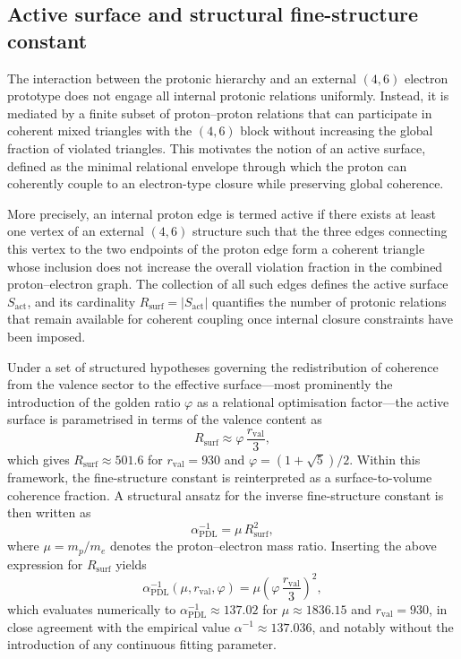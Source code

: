 \documentclass[11pt,a4paper]{article}
\begin{document}
\subsection{Active surface and structural fine-structure constant}
The interaction between the protonic hierarchy and an external $(4,6)$ electron prototype does not engage all internal protonic relations uniformly. Instead, it is mediated by a finite subset of proton–proton relations that can participate in coherent mixed triangles with the $(4,6)$ block without increasing the global fraction of violated triangles.\cite{LaubscherDerivationAlpha2026,LaubscherGoldenRatioPDL2026} This motivates the notion of an active surface, defined as the minimal relational envelope through which the proton can coherently couple to an electron-type closure while preserving global coherence.

More precisely, an internal proton edge is termed active if there exists at least one vertex of an external $(4,6)$ structure such that the three edges connecting this vertex to the two endpoints of the proton edge form a coherent triangle whose inclusion does not increase the overall violation fraction in the combined proton–electron graph.\cite{LaubscherDerivationAlpha2026} The collection of all such edges defines the active surface $S_{\mathrm{act}}$, and its cardinality $R_{\mathrm{surf}}=|S_{\mathrm{act}}|$ quantifies the number of protonic relations that remain available for coherent coupling once internal closure constraints have been imposed.

Under a set of structured hypotheses governing the redistribution of coherence from the valence sector to the effective surface—most prominently the introduction of the golden ratio $\varphi$ as a relational optimisation factor—the active surface is parametrised in terms of the valence content as
\begin{equation}
R_{\mathrm{surf}} \approx \varphi\,\frac{r_{\mathrm{val}}}{3},
\end{equation}
which gives $R_{\mathrm{surf}}\approx 501.6$ for $r_{\mathrm{val}}=930$ and $\varphi=(1+\sqrt{5})/2$.\cite{LaubscherDerivationAlpha2026,LaubscherGoldenRatioPDL2026} Within this framework, the fine-structure constant is reinterpreted as a surface-to-volume coherence fraction. A structural ansatz for the inverse fine-structure constant is then written as
\begin{equation}
\alpha_{\mathrm{PDL}}^{-1} = \mu\,R_{\mathrm{surf}}^{2},
\end{equation}
where $\mu=m_p/m_e$ denotes the proton–electron mass ratio. Inserting the above expression for $R_{\mathrm{surf}}$ yields
\begin{equation}
\alpha_{\mathrm{PDL}}^{-1}(\mu,r_{\mathrm{val}},\varphi) = \mu\left(\varphi\,\frac{r_{\mathrm{val}}}{3}\right)^{2},
\end{equation}
which evaluates numerically to $\alpha_{\mathrm{PDL}}^{-1}\approx 137.02$ for $\mu\approx 1836.15$ and $r_{\mathrm{val}}=930$, in close agreement with the empirical value $\alpha^{-1}\approx 137.036$, and notably without the introduction of any continuous fitting parameter.\cite{LaubscherDerivationAlpha2026}
\end{document}

